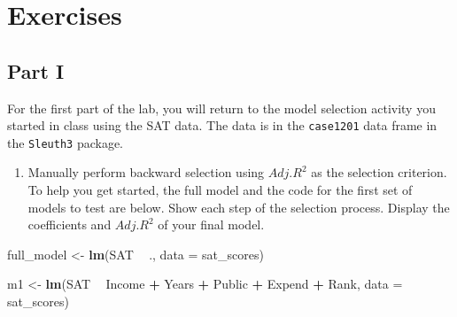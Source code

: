 \documentclass[]{book}
\newenvironment{Shaded}{\begin{snugshade}}{\end{snugshade}}
\newcommand{\KeywordTok}[1]{\textcolor[rgb]{0.13,0.29,0.53}{\textbf{#1}}}
\newcommand{\DataTypeTok}[1]{\textcolor[rgb]{0.13,0.29,0.53}{#1}}
\newcommand{\StringTok}[1]{\textcolor[rgb]{0.31,0.60,0.02}{#1}}
\newcommand{\OperatorTok}[1]{\textcolor[rgb]{0.81,0.36,0.00}{\textbf{#1}}}
\newcommand{\NormalTok}[1]{#1}
\providecommand{\tightlist}{%
  \setlength{\itemsep}{0pt}\setlength{\parskip}{0pt}}
\begin{document}
\section{Exercises}\label{exercises-5}

\subsection{Part I}\label{part-i-1}

For the first part of the lab, you will return to the model selection
activity you started in class using the SAT data. The data is in the
\texttt{case1201} data frame in the \texttt{Sleuth3} package.

\begin{Shaded}
\end{Shaded}

\begin{enumerate}
\def\labelenumi{\arabic{enumi}.}
\tightlist
\item
  Manually perform backward selection using \(Adj. R^2\) as the
  selection criterion. To help you get started, the full model and the
  code for the first set of models to test are below. Show each step of
  the selection process. Display the coefficients and \(Adj. R^2\) of
  your final model.
\end{enumerate}

\begin{Shaded}
\begin{Highlighting}[]
\NormalTok{full_model <-}\StringTok{ }\KeywordTok{lm}\NormalTok{(SAT }\OperatorTok{~}\StringTok{ }\NormalTok{., }\DataTypeTok{data =}\NormalTok{ sat_scores)}
\end{Highlighting}
\end{Shaded}

\begin{Shaded}
\begin{Highlighting}[]
\NormalTok{m1 <-}\StringTok{ }\KeywordTok{lm}\NormalTok{(SAT }\OperatorTok{~}\StringTok{ }\NormalTok{Income }\OperatorTok{+}\StringTok{ }\NormalTok{Years }\OperatorTok{+}\StringTok{ }\NormalTok{Public }\OperatorTok{+}\StringTok{ }\NormalTok{Expend }\OperatorTok{+}\StringTok{ }\NormalTok{Rank, }\DataTypeTok{data =}\NormalTok{ sat_scores)}
\end{Highlighting}
\end{Shaded}
\end{document}
